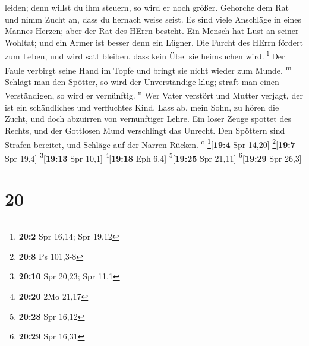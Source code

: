leiden; denn willst du ihm steuern, so wird er noch größer.
 Gehorche dem Rat und nimm Zucht an, dass du hernach
weise seist.  Es sind viele Anschläge in eines Mannes
Herzen; aber der Rat des HErrn besteht.  Ein Mensch hat
Lust an seiner Wohltat; und ein Armer ist besser denn ein Lügner.
 Die Furcht des HErrn fördert zum Leben, und wird satt
bleiben, dass kein Übel sie heimsuchen wird. \textsuperscript{l}
 Der Faule verbirgt seine Hand im Topfe und bringt sie
nicht wieder zum Munde. \textsuperscript{m}  Schlägt man
den Spötter, so wird der Unverständige klug; straft man einen
Verständigen, so wird er vernünftig. \textsuperscript{n} 
Wer Vater verstört und Mutter verjagt, der ist ein schändliches und
verfluchtes Kind.  Lass ab, mein Sohn, zu hören die
Zucht, und doch abzuirren von vernünftiger Lehre.  Ein
loser Zeuge spottet des Rechts, und der Gottlosen Mund verschlingt das
Unrecht.  Den Spöttern sind Strafen bereitet, und Schläge
auf der Narren Rücken. \textsuperscript{o} \footnote{\textbf{20:2} Spr
  16,14; Spr 19,12}{[}\textbf{19:4} Spr 14,20{]}
\footnote{\textbf{20:8} Ps 101,3-8}{[}\textbf{19:7} Spr 19,4{]}
\footnote{\textbf{20:10} Spr 20,23; Spr 11,1}{[}\textbf{19:13} Spr
10,1{]} \footnote{\textbf{20:20} 2Mo 21,17}{[}\textbf{19:18} Eph 6,4{]}
\footnote{\textbf{20:28} Spr 16,12}{[}\textbf{19:25} Spr 21,11{]}
\footnote{\textbf{20:29} Spr 16,31}{[}\textbf{19:29} Spr 26,3{]}

\hypertarget{section-19}{%
\section{20}\label{section-19}}

